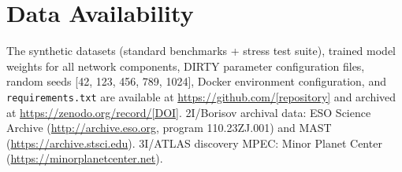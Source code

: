 \documentclass[preprint2]{aastex631}
\begin{document}
\section*{Data Availability}
The synthetic datasets (standard benchmarks + stress test suite), trained model weights for all network components, DIRTY parameter configuration files, random seeds [42, 123, 456, 789, 1024], Docker environment configuration, and \texttt{requirements.txt} are available at \url{https://github.com/[repository]} and archived at \url{https://zenodo.org/record/[DOI]}. 2I/Borisov archival data: ESO Science Archive (\url{http://archive.eso.org}, program 110.23ZJ.001) and MAST (\url{https://archive.stsci.edu}). 3I/ATLAS discovery MPEC: Minor Planet Center (\url{https://minorplanetcenter.net}).


\end{document}
